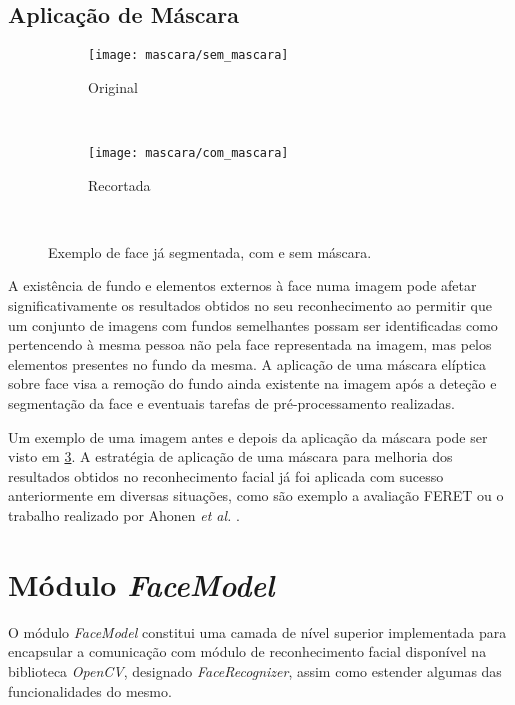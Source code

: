 \subsection{Aplicação de Máscara} \label{sec:mascara}

\begin{figure}[t]
        \centering
        \begin{subfigure}[b]{0.2\textwidth}
                \centering
                \texttt{[image: mascara/sem\_mascara]}
                \caption{Original}
                \label{fig:sem-mascara}
        \end{subfigure}%
        ~ ~ ~
        \begin{subfigure}[b]{0.2\textwidth}
                \centering
                \texttt{[image: mascara/com\_mascara]}
                \caption{Recortada}
                \label{fig:com-mascara}
        \end{subfigure}
        ~ 
        \caption{Exemplo de face já segmentada, com e sem máscara.}\label{fig:mascara}
\end{figure}

A existência de fundo e elementos externos à face numa imagem pode afetar significativamente os resultados obtidos no seu reconhecimento ao permitir que um conjunto de imagens com fundos semelhantes possam ser identificadas como pertencendo à mesma pessoa não pela face representada na imagem, mas pelos elementos presentes no fundo da mesma. A aplicação de uma máscara elíptica sobre face visa a remoção do fundo ainda existente na imagem após a deteção e segmentação da face e eventuais tarefas de pré-processamento realizadas.

Um exemplo de uma imagem antes e depois da aplicação da máscara pode ser visto em \ref{fig:mascara}. A estratégia de aplicação de uma máscara para melhoria dos resultados obtidos no reconhecimento facial já foi aplicada com sucesso anteriormente em diversas situações, como são exemplo a avaliação FERET \cite{Phillips2000} ou o trabalho realizado por Ahonen \textit{et al.} \cite{ahonen2004face}.

\section{Módulo \textit{FaceModel}} \label{sec:facemodel}
O módulo \textit{FaceModel} constitui uma camada de nível superior implementada para encapsular a comunicação com módulo de reconhecimento facial disponível na biblioteca \textit{OpenCV}, designado \textit{FaceRecognizer}, assim como estender algumas das funcionalidades do mesmo. 

